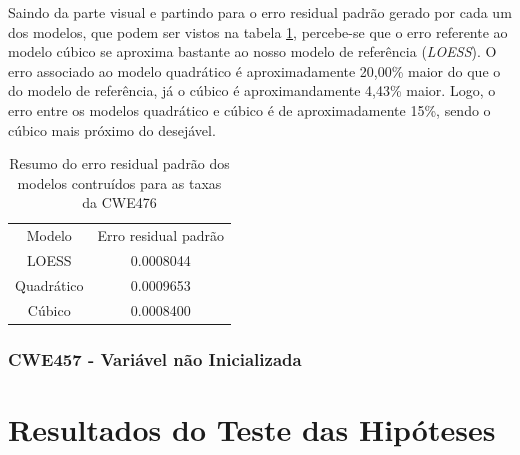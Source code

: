 Saindo da parte visual e partindo para o erro residual padrão gerado por cada um dos
modelos, que podem ser vistos na tabela \ref{tab:cwe476-erros}, percebe-se que o
erro referente ao modelo cúbico se aproxima bastante ao nosso modelo de
referência (\textit{LOESS}). O erro associado ao modelo quadrático é
aproximadamente 20,00\% maior do que o do modelo de referência, já o cúbico é
aproximandamente 4,43\% maior. Logo, o erro entre os modelos quadrático e cúbico
é de aproximadamente 15\%, sendo o cúbico mais próximo do desejável.

\begin{table}[h]
 \centering
 \begin{tabular}{cc}
  \rowcolor[HTML]{EFEFEF} 
  {Modelo} & {Erro residual padrão} \\
  {LOESS}  & 0.0008044                  \\
  Quadrático   & 0.0009653                  \\
  Cúbico       & 0.0008400                 
 \end{tabular}
 \caption{Resumo do erro residual padrão dos modelos contruídos para as taxas da
 CWE476}
 \label{tab:cwe476-erros}
\end{table}



\subsubsection{CWE457 - Variável não Inicializada}

\section{Resultados do Teste das Hipóteses}
